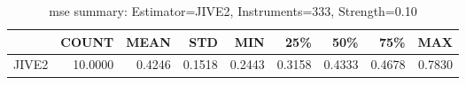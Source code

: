 \begin{table}[ht]
\centering
\caption{mse summary: Estimator=JIVE2, Instruments=333, Strength=0.10}
\begin{tabular}{lrrrrrrrr}
\toprule
 & COUNT & MEAN & STD & MIN & 25\% & 50\% & 75\% & MAX \\
\midrule
JIVE2 & 10.0000 & 0.4246 & 0.1518 & 0.2443 & 0.3158 & 0.4333 & 0.4678 & 0.7830 \\
\bottomrule
\end{tabular}
\end{table}
